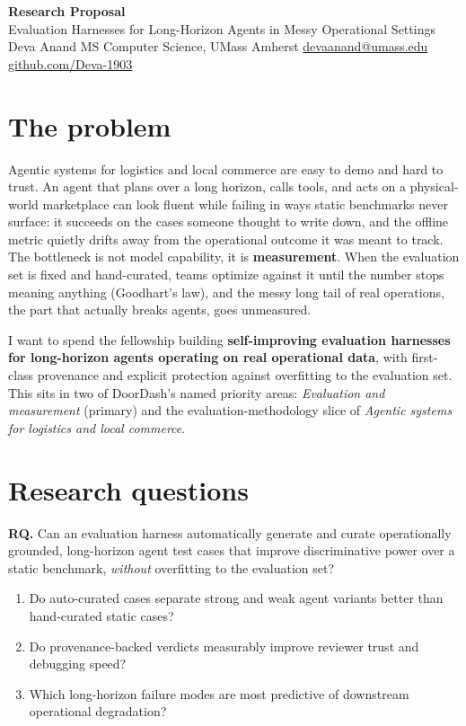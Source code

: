 \documentclass[letterpaper,11pt]{article}
\begin{document}
\begin{center}
  {\LARGE \bfseries \textcolor{ResumeNavy}{Research Proposal}} \\[2pt]
  {\large Evaluation Harnesses for Long-Horizon Agents in Messy Operational Settings} \\[4pt]
  {\normalsize Deva Anand \enspace\textbar\enspace MS Computer Science, UMass Amherst \enspace\textbar\enspace
  \href{mailto:devaanand@umass.edu}{devaanand@umass.edu} \enspace\textbar\enspace
  \href{https://github.com/Deva-1903}{github.com/Deva-1903}}
\end{center}
\vspace{2pt}

\section{The problem}
Agentic systems for logistics and local commerce are easy to demo and hard to trust. An agent that plans over a long horizon, calls tools, and acts on a physical-world marketplace can look fluent while failing in ways static benchmarks never surface: it succeeds on the cases someone thought to write down, and the offline metric quietly drifts away from the operational outcome it was meant to track. The bottleneck is not model capability, it is \textbf{measurement}. When the evaluation set is fixed and hand-curated, teams optimize against it until the number stops meaning anything (Goodhart's law), and the messy long tail of real operations, the part that actually breaks agents, goes unmeasured.

I want to spend the fellowship building \textbf{self-improving evaluation harnesses for long-horizon agents operating on real operational data}, with first-class provenance and explicit protection against overfitting to the evaluation set. This sits in two of DoorDash's named priority areas: \emph{Evaluation and measurement} (primary) and the evaluation-methodology slice of \emph{Agentic systems for logistics and local commerce}.

\section{Research questions}
\textbf{RQ.} Can an evaluation harness automatically generate and curate operationally grounded, long-horizon agent test cases that improve discriminative power over a static benchmark, \emph{without} overfitting to the evaluation set?
\begin{enumerate}[leftmargin=1.5em, itemsep=1pt, topsep=2pt]
  \item Do auto-curated cases separate strong and weak agent variants better than hand-curated static cases?
  \item Do provenance-backed verdicts measurably improve reviewer trust and debugging speed?
  \item Which long-horizon failure modes are most predictive of downstream operational degradation?
\end{enumerate}
\end{document}
